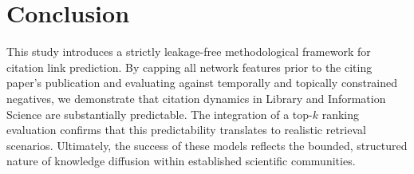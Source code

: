\documentclass[11pt,a4paper]{article}
\begin{document}
\section{Conclusion}
\label{sec:conclusion}
This study introduces a strictly leakage-free methodological framework for citation link prediction. By capping all network features prior to the citing paper's publication and evaluating against temporally and topically constrained negatives, we demonstrate that citation dynamics in Library and Information Science are substantially predictable. The integration of a top-$k$ ranking evaluation confirms that this predictability translates to realistic retrieval scenarios. Ultimately, the success of these models reflects the bounded, structured nature of knowledge diffusion within established scientific communities.



\end{document}
